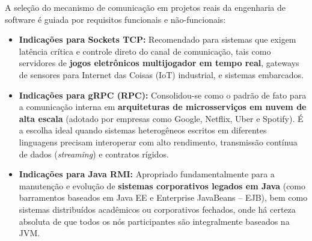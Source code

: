\documentclass[12pt, a4paper]{article}
\begin{document}
A seleção do mecanismo de comunicação em projetos reais da engenharia de software é guiada por requisitos funcionais e não-funcionais:

\begin{itemize}
    \item \textbf{Indicações para Sockets TCP:}
    Recomendado para sistemas que exigem latência crítica e controle direto do canal de comunicação, tais como servidores de \textbf{jogos eletrônicos multijogador em tempo real}, gateways de sensores para Internet das Coisas (IoT) industrial, e sistemas embarcados.
    
    \item \textbf{Indicações para gRPC (RPC):}
    Consolidou-se como o padrão de fato para a comunicação interna em \textbf{arquiteturas de microsserviços em nuvem de alta escala} (adotado por empresas como Google, Netflix, Uber e Spotify). É a escolha ideal quando sistemas heterogêneos escritos em diferentes linguagens precisam interoperar com alto rendimento, transmissão contínua de dados (\textit{streaming}) e contratos rígidos.

    \item \textbf{Indicações para Java RMI:}
    Apropriado fundamentalmente para a manutenção e evolução de \textbf{sistemas corporativos legados em Java} (como barramentos baseados em Java EE e Enterprise JavaBeans -- EJB), bem como sistemas distribuídos acadêmicos ou corporativos fechados, onde há certeza absoluta de que todos os nós participantes são integralmente baseados na JVM.
\end{itemize}



\end{document}
